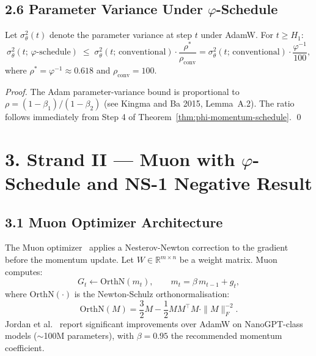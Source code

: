 \subsection{2.6 Parameter Variance Under \(\varphi\)-Schedule}

\begin{proposition}
  \label{prop:variance-reduction}
  Let \(\sigma^2_\theta(t)\) denote the parameter variance at step $t$
  under AdamW.  For \(t \geq H_1\):
  \[
    \sigma^2_\theta(t;\,\varphi\text{-schedule})
    \;\leq\;
    \sigma^2_\theta(t;\,\text{conventional})
    \cdot \frac{\rho^*}{\rho_{\mathrm{conv}}}
    = \sigma^2_\theta(t;\,\text{conventional}) \cdot \frac{\varphi^{-1}}{100},
  \]
  where \(\rho^* = \varphi^{-1} \approx 0.618\) and
  \(\rho_{\mathrm{conv}} = 100\).
\end{proposition}

\begin{proof}
  The Adam parameter-variance bound is proportional to
  \(\rho = (1-\beta_1)/(1-\beta_2)\) (see Kingma and Ba 2015,
  Lemma~A.2).  The ratio follows immediately from Step 4 of
  Theorem~\ref{thm:phi-momentum-schedule}. \qed
\end{proof}

\section{3. Strand II --- Muon with \(\varphi\)-Schedule and NS-1
         Negative Result}
\label{sec:28-strand-II}

\subsection{3.1 Muon Optimizer Architecture}

The Muon optimizer~\cite{jordan_muon_2024} applies a Nesterov-Newton
correction to the gradient before the momentum update.  Let
\(W \in \mathbb{R}^{m \times n}\) be a weight matrix.  Muon computes:
\[
  G_t \leftarrow \mathrm{OrthN}(m_t),\qquad
  m_t = \beta\, m_{t-1} + g_t,
\]
where \(\mathrm{OrthN}(\cdot)\) is the Newton-Schulz orthonormalisation:
\[
  \mathrm{OrthN}(M)
  = \frac{3}{2} M - \frac{1}{2} M M^\top M \cdot \|M\|_F^{-2}.
\]
Jordan et al.\ \cite{jordan_muon_2024} report significant improvements over
AdamW on NanoGPT-class models ($\sim$100M parameters), with
\(\beta = 0.95\) the recommended momentum coefficient.


